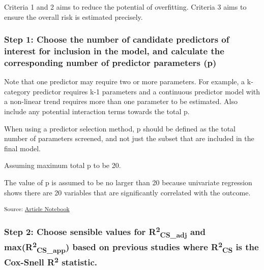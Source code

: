\documentclass[
  letterpaper,
  DIV=11,
  numbers=noendperiod]{scrartcl}
\begin{document}
Criteria 1 and 2 aims to reduce the potential of overfitting. Criteria 3
aims to ensure the overall risk is estimated precisely.

\subsubsection{Step 1: Choose the number of candidate predictors of
interest for inclusion in the model, and calculate the corresponding
number of predictor parameters
(p)}\label{step-1-choose-the-number-of-candidate-predictors-of-interest-for-inclusion-in-the-model-and-calculate-the-corresponding-number-of-predictor-parameters-p}

Note that one predictor may require two or more parameters. For example,
a k-category predictor requires k-1 parameters and a continuous
predictor model with a non-linear trend requires more than one parameter
to be estimated. Also include any potential interaction terms towards
the total p.

When using a predictor selection method, p should be defined as the
total number of parameters screened, and not just the subset that are
included in the final model.

Assuming maximum total p to be 20.

\begin{tcolorbox}[enhanced jigsaw, colback=white, title=\textcolor{quarto-callout-note-color}{\faInfo}\hspace{0.5em}{Note}, opacityback=0, opacitybacktitle=0.6, bottomtitle=1mm, leftrule=.75mm, toprule=.15mm, bottomrule=.15mm, breakable, toptitle=1mm, titlerule=0mm, arc=.35mm, rightrule=.15mm, colframe=quarto-callout-note-color-frame, coltitle=black, left=2mm, colbacktitle=quarto-callout-note-color!10!white]

The value of p is assumed to be no larger than 20 because univariate
regression shows there are 20 variables that are significantly
correlated with the outcome.

\end{tcolorbox}

\textsubscript{Source:
\href{https://AnTangQuoc.github.io/LZD-TP-pred-model/index.qmd.html}{Article
Notebook}}

\subsubsection{\texorpdfstring{Step 2: Choose sensible values for
R\textsuperscript{2}\textsubscript{CS\_adj} and
max(R\textsuperscript{2}\textsubscript{CS\_app}) based on previous
studies where R\textsuperscript{2}\textsubscript{CS} is the Cox-Snell
R\textsuperscript{2}
statistic.}{Step 2: Choose sensible values for R2CS\_adj and max(R2CS\_app) based on previous studies where R2CS is the Cox-Snell R2 statistic.}}\label{step-2-choose-sensible-values-for-r2cs_adj-and-maxr2cs_app-based-on-previous-studies-where-r2cs-is-the-cox-snell-r2-statistic.}
\end{document}
